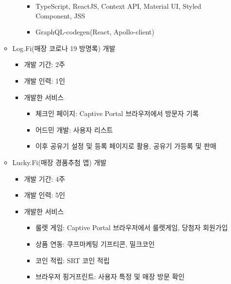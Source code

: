\begin{itemize}[label=]
\begin{itemize}[label=]
\begin{itemize}[label=]
			                  \begin{itemize}
				                  \item TypeScript, ReactJS, Context API, Material UI, Styled Component, JSS
				                  \item GraphQL-codegen(React, Apollo-client)
			                  \end{itemize}
		            \end{itemize}
		      \item Log.Fi(매장 코로나 19 방명록) 개발 \hyperref[logfi]{\space {}}
		            \begin{itemize}[label=]
			            \item 개발 기간: 2주
			            \item 개발 인력: 1인
			            \item 개발한 서비스
			                  \begin{itemize}
				                  \item 체크인 페이지: Captive Portal 브라우저에서 방문자 기록
				                  \item 어드민 개발: 사용자 리스트
				                  \item 이후 공유기 설정 및 등록 페이지로 활용, 공유기 가등록 및 판매
			                  \end{itemize}
		            \end{itemize}
		      \item Lucky.Fi(매장 경품추첨 앱) 개발 \hyperref[luckyfi]{\space {}}
		            \begin{itemize}[label=]
			            \item 개발 기간: 4주
			            \item 개발 인력: 5인
			            \item 개발한 서비스
			                  \begin{itemize}
				                  \item 룰렛 게임: Captive Portal 브라우저에서 룰렛게임, 당첨자 회원가입
				                  \item 상품 연동: 쿠프마케팅 기프티콘, 밀크코인
				                  \item 코인 적립: SRT 코인 적립
				                  \item 브라우저 핑거프린트: 사용자 특정 및 매장 방문 확인
			                  \end{itemize}
		            \end{itemize}

\end{itemize}
\end{itemize}

